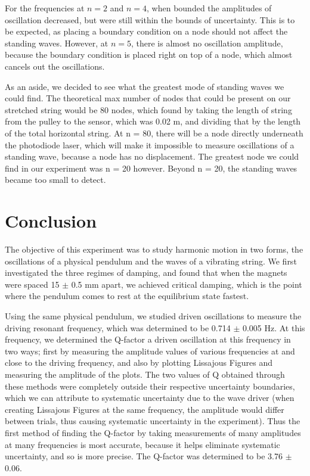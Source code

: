 \documentclass[11pt]{report}
\begin{document}
\setlength{\parindent}{5ex}
For the frequencies at $n=2$ and $n=4$, when bounded the amplitudes of
oscillation decreased, but were still within the bounds of uncertainty.  This is
to be expected, as placing a boundary condition on a node should not affect the
standing waves.  However, at $n=5$, there is almost no oscillation amplitude,
because the boundary condition is placed right on top of a node, which almost
cancels out the oscillations.

As an aside, we decided to see what the greatest mode of standing waves we could
find.  The theoretical max number of nodes that could be present on our
stretched string would be 80 nodes, which found by taking the length of string
from the pulley to the sensor, which was 0.02 m, and dividing that by the length
of the total horizontal string.  At n = 80, there will be a node directly
underneath the photodiode laser, which will make it impossible to measure
oscillations of a standing wave, because a node has no displacement.  The
greatest node we could find in our experiment was n = 20 however.  Beyond n =
20, the standing waves became too small to detect. 

\section*{Conclusion}

The objective of this experiment was to study harmonic motion in two forms, the
oscillations of a physical pendulum and the waves of a vibrating string.  We
first investigated the three regimes of damping, and found that when the magnets
were spaced 15 $\pm$ 0.5 mm apart, we achieved critical damping, which is the point where
the pendulum comes to rest at the equilibrium state fastest.  

Using the same physical pendulum, we studied driven oscillations to measure the
driving resonant frequency, which was determined to be 0.714 $\pm$ 0.005 Hz.  At
this frequency, we
determined the Q-factor a driven oscillation at this frequency in two ways;
first by measuring the amplitude values of various frequencies at and close to the
driving frequency, and also by plotting Lissajous Figures and measuring the
amplitude of the plots.  The two values of Q obtained through these methods were
completely outside their respective uncertainty boundaries, which we can
attribute to systematic uncertainty due to the wave driver (when creating
Lissajous Figures at the same frequency, the amplitude would differ between
trials, thus causing systematic uncertainty in the experiment).  Thus the first
method of finding the Q-factor by taking measurements of many amplitudes at many
frequencies is most accurate, because it helps eliminate systematic uncertainty,
and so is more precise. The Q-factor was determined to be 3.76 $\pm$ 0.06.
\end{document}
